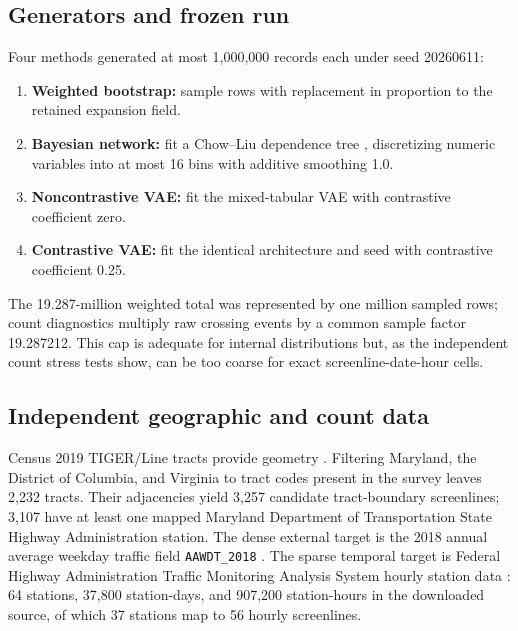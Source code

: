 \documentclass[numbered]{trbunofficial}
\begin{document}
\subsection{Generators and frozen run}

Four methods generated at most 1,000,000 records each under seed 20260611:

\begin{enumerate}[leftmargin=0.27in,itemsep=1pt,topsep=3pt]
\item \textbf{Weighted bootstrap:} sample rows with replacement in proportion to the retained expansion field.
\item \textbf{Bayesian network:} fit a Chow--Liu dependence tree \cite{chow1968dependence}, discretizing numeric variables into at most 16 bins with additive smoothing 1.0.
\item \textbf{Noncontrastive VAE:} fit the mixed-tabular VAE with contrastive coefficient zero.
\item \textbf{Contrastive VAE:} fit the identical architecture and seed with contrastive coefficient 0.25.
\end{enumerate}

The 19.287-million weighted total was represented by one million sampled rows; count diagnostics multiply raw crossing events by a common sample factor 19.287212. This cap is adequate for internal distributions but, as the independent count stress tests show, can be too coarse for exact screenline-date-hour cells.

\subsection{Independent geographic and count data}

Census 2019 TIGER/Line tracts provide geometry \cite{census2019tiger}. Filtering Maryland, the District of Columbia, and Virginia to tract codes present in the survey leaves 2,232 tracts. Their adjacencies yield 3,257 candidate tract-boundary screenlines; 3,107 have at least one mapped Maryland Department of Transportation State Highway Administration station. The dense external target is the 2018 annual average weekday traffic field \texttt{AAWDT\_2018} \cite{mdot2018aawdt}. The sparse temporal target is Federal Highway Administration Traffic Monitoring Analysis System hourly station data \cite{fhwa2018tmas,fhwa2022tmg}: 64 stations, 37,800 station-days, and 907,200 station-hours in the downloaded source, of which 37 stations map to 56 hourly screenlines.
\end{document}
